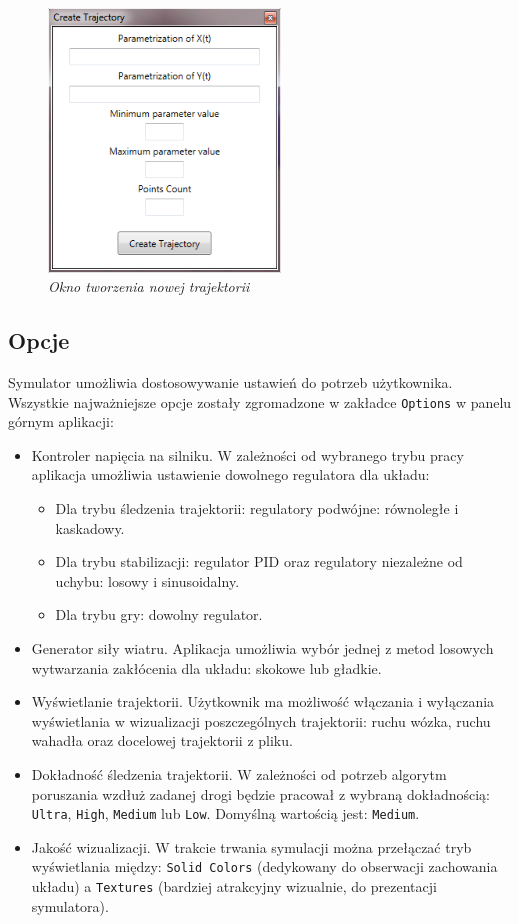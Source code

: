 \documentclass[12pt, oneside]{report}
\theoremstyle{definition}
\begin{document}
\begin{figure}[H]
	\centering
		\includegraphics[width = 175pt]{CreateTrajectory} 
		\caption{\textit{Okno tworzenia nowej trajektorii}}
		\label{CreateTrajectory}
\end{figure}
\subsection{Opcje}
Symulator umożliwia dostosowywanie ustawień do potrzeb użytkownika. Wszystkie najważniejsze opcje zostały zgromadzone w zakładce \texttt{Options} w panelu górnym aplikacji:
\begin{itemize}
\item Kontroler napięcia na silniku. W zależności od wybranego trybu pracy aplikacja umożliwia ustawienie dowolnego regulatora dla układu:
\begin{itemize}
\item Dla trybu śledzenia trajektorii: regulatory podwójne: równoległe i kaskadowy.
\item Dla trybu stabilizacji: regulator PID oraz regulatory niezależne od uchybu: losowy i sinusoidalny.
\item Dla trybu gry: dowolny regulator.
\end{itemize}
\item Generator siły wiatru. Aplikacja umożliwia wybór jednej z metod losowych wytwarzania zakłócenia dla układu: skokowe lub gładkie.
\item Wyświetlanie trajektorii. Użytkownik ma możliwość włączania i wyłączania wyświetlania w wizualizacji poszczególnych trajektorii: ruchu wózka, ruchu wahadła oraz docelowej trajektorii z pliku.
\item Dokładność śledzenia trajektorii. W zależności od potrzeb algorytm poruszania wzdłuż zadanej drogi będzie pracował z wybraną dokładnością: \texttt{Ultra}, \texttt{High}, \texttt{Medium} lub \texttt{Low}. Domyślną wartością jest: \texttt{Medium}.
\item Jakość wizualizacji. W trakcie trwania symulacji można przełączać tryb wyświetlania między: \texttt{Solid Colors} (dedykowany do obserwacji zachowania układu) a \texttt{Textures} (bardziej atrakcyjny wizualnie, do prezentacji symulatora).
\end{itemize}
\end{document}
